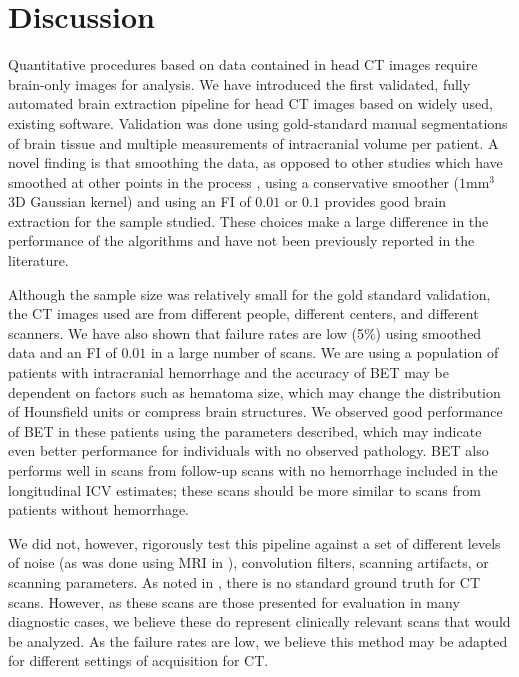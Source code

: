 \documentclass{elsarticle}\usepackage[]{graphicx}\usepackage[]{color}
\begin{document}
\section{Discussion}
Quantitative procedures based on data contained in head CT images require brain-only images for analysis. We have introduced the first validated, fully automated brain extraction pipeline for head CT images based on widely used, existing software. Validation was done using gold-standard manual segmentations of brain tissue and multiple measurements of intracranial volume per patient.  A novel finding is that smoothing the data, as opposed to other studies which have smoothed at other points in the process \citep{mandell2014volumetric1}, using a conservative smoother ($1$mm$^3$ 3D Gaussian kernel) and using an FI of $0.01$ or $0.1$ provides good brain extraction for the sample studied.  These choices make a large difference in the performance of the algorithms and have not been previously reported in the literature.

Although the sample size was relatively small for the gold standard validation, the CT images used are from different people, different centers, and different scanners.  We have also shown that failure rates are low (5\%) using smoothed data and an FI of $0.01$ in a large number of scans.  
We are using a population of patients with intracranial hemorrhage and the accuracy of BET may be dependent on factors such as hematoma size, which may change the distribution of Hounsfield units or compress brain structures.  We observed good performance of BET in these patients using the parameters described, which may indicate even better performance for individuals with no observed pathology.  BET also performs well in scans from follow-up scans with no hemorrhage included in the longitudinal ICV estimates; these scans should be more similar to scans from patients without hemorrhage.   

We did not, however, rigorously test this pipeline against a set of different levels of noise (as was done using MRI in \citep{mandell2014volumetric1}), convolution filters, scanning artifacts, or scanning parameters.  As noted in \citet{mandell2014volumetric1}, there is no standard ground truth for CT scans.  However, as these scans are those presented for evaluation in many diagnostic cases, we believe these do represent clinically relevant scans that would be analyzed.  As the failure rates are low, we believe this method may be adapted for different settings of acquisition for CT.  
\end{document}
